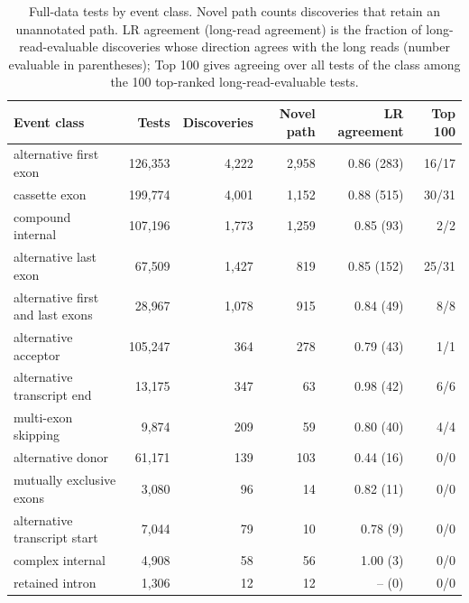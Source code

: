 \documentclass[11pt]{article}
\begin{document}
\begin{table}[ht]
\centering
\footnotesize
\setlength{\tabcolsep}{4pt}
\begin{tabular}{lrrrrr}
\toprule
Event class & Tests & Discoveries & Novel path & LR agreement & Top 100\\
\midrule
alternative first exon & 126{,}353 & 4{,}222 & 2{,}958 & 0.86 (283) & 16/17\\
cassette exon & 199{,}774 & 4{,}001 & 1{,}152 & 0.88 (515) & 30/31\\
compound internal & 107{,}196 & 1{,}773 & 1{,}259 & 0.85 (93) & 2/2\\
alternative last exon & 67{,}509 & 1{,}427 & 819 & 0.85 (152) & 25/31\\
alternative first and last exons & 28{,}967 & 1{,}078 & 915 & 0.84 (49) & 8/8\\
alternative acceptor & 105{,}247 & 364 & 278 & 0.79 (43) & 1/1\\
alternative transcript end & 13{,}175 & 347 & 63 & 0.98 (42) & 6/6\\
multi-exon skipping & 9{,}874 & 209 & 59 & 0.80 (40) & 4/4\\
alternative donor & 61{,}171 & 139 & 103 & 0.44 (16) & 0/0\\
mutually exclusive exons & 3{,}080 & 96 & 14 & 0.82 (11) & 0/0\\
alternative transcript start & 7{,}044 & 79 & 10 & 0.78 (9) & 0/0\\
complex internal & 4{,}908 & 58 & 56 & 1.00 (3) & 0/0\\
retained intron & 1{,}306 & 12 & 12 & -- (0) & 0/0\\
\bottomrule
\end{tabular}
\caption{Full-data tests by event class. Novel path counts discoveries that retain an unannotated path. LR agreement (long-read agreement) is the fraction of long-read-evaluable discoveries whose direction agrees with the long reads (number evaluable in parentheses); Top 100 gives agreeing over all tests of the class among the 100 top-ranked long-read-evaluable tests.}
\label{tab:events}
\end{table}
\end{document}

